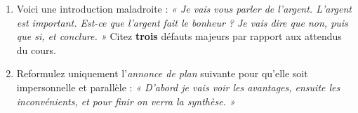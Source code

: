 \documentclass[11pt]{article}
\begin{document}
\begin{exercice}
\begin{enumerate}
    \item Voici une introduction maladroite : \textit{« Je vais vous parler de l'argent. L'argent est important. Est-ce que l'argent fait le bonheur ? Je vais dire que non, puis que si, et conclure. »} Citez \textbf{trois} défauts majeurs par rapport aux attendus du cours.
    \item Reformulez uniquement l'\textit{annonce de plan} suivante pour qu'elle soit impersonnelle et parallèle : \textit{« D'abord je vais voir les avantages, ensuite les inconvénients, et pour finir on verra la synthèse. »}
\end{enumerate}
\end{exercice}
\end{document}
